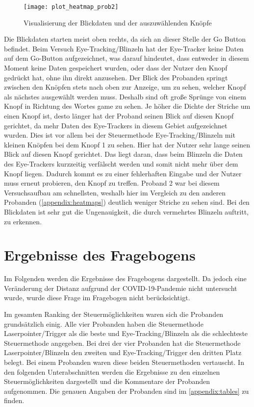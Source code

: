 \begin{figure}[!htbp]
	\centering
	\texttt{[image: plot\_heatmap\_prob2]}
	\caption[Visualisierung der Blickdaten und der auszuwählenden Knöpfe] {Visualisierung der Blickdaten und der auszuwählenden Knöpfe}
	\label{fig:plotheatmapprob2}
\end{figure}

Die Blickdaten starten meist oben rechts, da sich an dieser Stelle der Go Button befindet. Beim Versuch Eye-Tracking/Blinzeln hat der Eye-Tracker keine Daten auf dem Go-Button aufgezeichnet, was darauf hindeutet, dass entweder in diesem Moment keine Daten gespeichert wurden, oder dass der Nutzer den Knopf gedrückt hat, ohne ihn direkt anzusehen. Der Blick des Probanden springt zwischen den Knöpfen stets nach oben zur Anzeige, um zu sehen, welcher Knopf als nächstes ausgewählt werden muss. Deshalb sind oft große Sprünge von einem Knopf in Richtung des Wortes \glqq game\grqq{} zu sehen. Je höher die Dichte der Striche um einen Knopf ist, desto länger hat der Proband seinen Blick auf diesen Knopf gerichtet, da mehr Daten des Eye-Trackers in diesem Gebiet aufgezeichnet wurden. Dies ist vor allem bei der Steuermethode Eye-Tracking/Blinzeln mit kleinen Knöpfen bei dem Knopf 1 zu sehen. Hier hat der Nutzer sehr lange seinen Blick auf diesen Knopf gerichtet. Das liegt daran, dass beim Blinzeln die Daten des Eye-Trackers kurzzeitig verfälscht werden und somit nicht mehr über dem Knopf liegen. Dadurch kommt es zu einer fehlerhaften Eingabe und der Nutzer muss erneut probieren, den Knopf zu treffen. Proband 2 war bei diesem Versuchsaufbau am schnellsten, weshalb hier im Vergleich zu den anderen Probanden (\autoref{appendix:heatmaps}) deutlich weniger Striche zu sehen sind. Bei den Blickdaten ist sehr gut die Ungenauigkeit, die durch vermehrtes Blinzeln auftritt, zu erkennen.

\section{Ergebnisse des Fragebogens}
\label{section:resultquestions}
Im Folgenden werden die Ergebnisse des Fragebogens dargestellt. Da jedoch eine Veränderung der Distanz aufgrund der \ac{COVID-19}-Pandemie nicht untersucht wurde, wurde diese Frage im Fragebogen nicht berücksichtigt. 

Im gesamten Ranking der Steuermöglichkeiten waren sich die Probanden grundsätzlich einig. Alle vier Probanden haben die Steuermethode Laserpointer/Trigger als die beste und Eye-Tracking/Blinzeln als die schlechteste Steuermethode angegeben. Bei drei der vier Probanden hat die Steuermethode Laserpointer/Blinzeln den zweiten und Eye-Tracking/Trigger den dritten Platz belegt. Bei einem Probanden waren diese beiden Steuermethoden vertauscht. In den folgenden Unterabschnitten werden die Ergebnisse zu den einzelnen Steuermöglichkeiten dargestellt und die Kommentare der Probanden aufgenommen. Die genauen Angaben der Probanden sind im \autoref{appendix:tables} zu finden.

